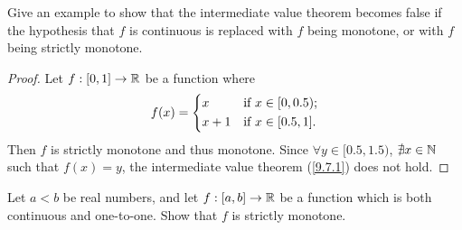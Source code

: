 \begin{ex}\label{ex:9.8.2}
  Give an example to show that the intermediate value theorem becomes false if the hypothesis that \(f\) is continuous is replaced with \(f\) being monotone, or with \(f\) being strictly monotone.
\end{ex}

\begin{proof}
  Let \(f : [0, 1] \to \mathbb{R}\) be a function where
  \[
    f(x) = \begin{dcases}
      x     & \text{if } x \in [0, 0.5); \\
      x + 1 & \text{if } x \in [0.5, 1].
    \end{dcases}
  \]
  Then \(f\) is strictly monotone and thus monotone.
  Since \(\forall y \in [0.5, 1.5)\), \(\nexists x \in \mathbb{N}\) such that \(f(x) = y\), the intermediate value theorem (\cref{9.7.1}) does not hold.
\end{proof}

\begin{ex}\label{ex:9.8.3}
  Let \(a < b\) be real numbers, and let \(f : [a, b] \to \mathbb{R}\) be a function which is both continuous and one-to-one.
  Show that \(f\) is strictly monotone.
\end{ex}

